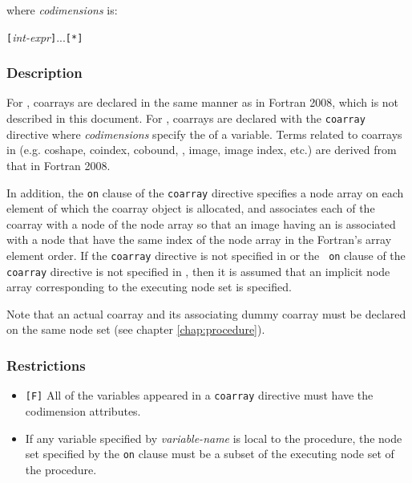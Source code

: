 where {\it codimensions} is:

\vspace{0.3cm}
\hspace{0.5cm} {\openb}{\tt [}{\it int-expr}{\tt ]}...{\closeb}{\tt [*]}

\subsubsection*{Description}

For {\XMPF}, coarrays are declared in the same manner as in Fortran
2008, which is not described in this document.
%
For {\XMPC}, coarrays are declared with the {\tt coarray} directive
where {\it codimensions} specify the  of a variable.
%
Terms related to coarrays in {\XMP} (e.g. coshape, coindex,
cobound, , image, image index, etc.) are derived from
that in Fortran 2008.

In addition, the {\tt on} clause of the {\tt coarray} directive
specifies a node array on each element of which the coarray object is
allocated, and associates each {\it {}} of the coarray with a
node of the node array so that an image having an {\it {}} is associated with a node that have the same index of the node
array in the Fortran's array element order.
%
If the {\tt coarray} directive is not specified in {\XMPF} or the {\tt
on} clause of the {\tt coarray} directive is not specified in {\XMPC},
then it is assumed that an implicit node array corresponding to the
executing node set is specified.

Note that an actual coarray and its associating dummy coarray must be
declared on the same node set (see chapter \ref{chap:procedure}).

\subsubsection*{Restrictions}

\begin{itemize}
 \item \verb![F]! All of the variables appeared in a {\tt coarray}
       directive must have the codimension attributes.
 \item If any variable specified by {\it variable-name} is local to the
       procedure, the node set specified by the {\tt on} clause must be
       a subset of the executing node set of the procedure.
\end{itemize}

